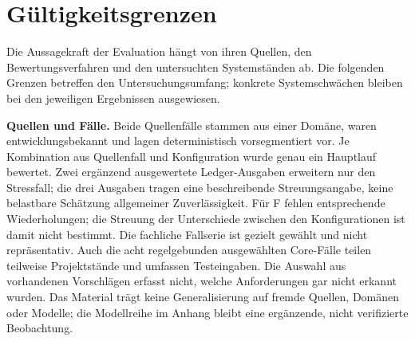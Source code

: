 
\section{Gültigkeitsgrenzen}
\label{sec:eval-grenzen}

Die Aussagekraft der Evaluation hängt von ihren Quellen, den
Bewertungsverfahren und den untersuchten Systemständen ab. Die
folgenden Grenzen betreffen den Untersuchungsumfang; konkrete
Systemschwächen bleiben bei den jeweiligen Ergebnissen ausgewiesen.

\textbf{Quellen und Fälle.} Beide Quellenfälle stammen aus einer
Domäne, waren entwicklungsbekannt und lagen deterministisch
vorsegmentiert vor. Je Kombination aus Quellenfall und Konfiguration
wurde genau ein Hauptlauf bewertet. Zwei ergänzend ausgewertete
Ledger-Ausgaben erweitern nur den Stressfall; die drei Ausgaben
tragen eine beschreibende Streuungsangabe, keine belastbare Schätzung
allgemeiner Zuverlässigkeit. Für F fehlen entsprechende
Wiederholungen; die Streuung der Unterschiede zwischen den
Konfigurationen ist damit nicht bestimmt. Die fachliche Fallserie ist gezielt
gewählt und nicht repräsentativ. Auch die acht regelgebunden
ausgewählten Core-Fälle teilen teilweise Projektstände und umfassen
Testeingaben. Die Auswahl aus vorhandenen Vorschlägen erfasst nicht,
welche Anforderungen gar nicht erkannt wurden. Das Material trägt keine
Generalisierung auf fremde Quellen, Domänen oder Modelle; die
Modellreihe im Anhang bleibt eine ergänzende, nicht verifizierte
Beobachtung.


